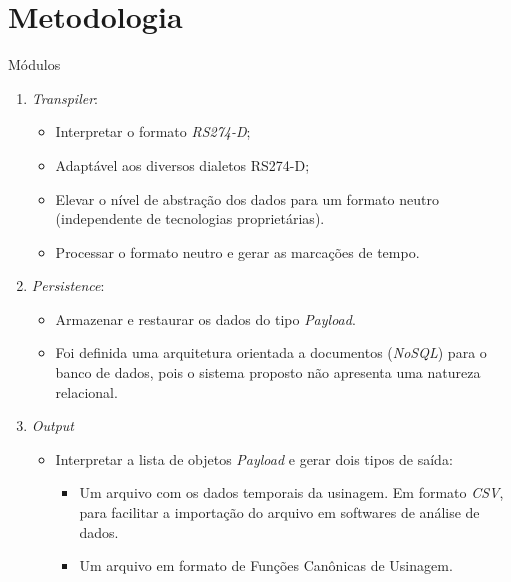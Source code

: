 \documentclass[aspectratio=169]{beamer}
\begin{document}
{\section{Metodologia}

\begin{frame}{Módulos}
  \begin{enumerate}
    \item {
      \emph{Transpiler}: 
      \begin{itemize}
        \item Interpretar o formato \emph{RS274-D};
        \item Adaptável aos diversos dialetos RS274-D;
        \item Elevar o nível de abstração dos dados para um formato 
              neutro (independente de tecnologias proprietárias).
        \item Processar o formato neutro e gerar as marcações de tempo.
      \end{itemize}
    }

    \item {
      \emph{Persistence}:
      \begin{itemize}
        \item Armazenar e restaurar os dados do tipo \emph{Payload}.
        \item Foi definida uma arquitetura orientada a documentos 
              (\emph{NoSQL}) para o banco de dados, pois o sistema 
              proposto não apresenta uma natureza relacional.
      \end{itemize}
    }

    \item {
      \emph{Output}
      \begin{itemize}
        \item Interpretar a lista de objetos \emph{Payload} 
              e gerar dois tipos de saída:
        \begin{itemize}
              \item Um arquivo com os dados temporais da usinagem. 
                    Em formato \emph{CSV}, para facilitar a importação 
                    do arquivo em softwares de análise de dados.
              \item Um arquivo em formato de Funções Canônicas de Usinagem.
        \end{itemize}
      \end{itemize}
    }

  \end{enumerate}
\end{frame}


}
\end{document}
